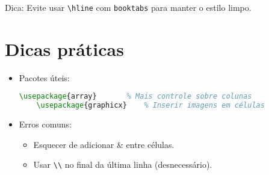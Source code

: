 Dica: Evite usar \verb|\hline| com \verb|booktabs| para manter o estilo limpo.

\section{Dicas práticas}

\begin{itemize}
    \item Pacotes úteis:
    \begin{lstlisting}[language=tex, caption=Pacotes úteis e interessantes para usar com tabelas]
    \usepackage{array}       % Mais controle sobre colunas
    \usepackage{graphicx}    % Inserir imagens em células
    \end{lstlisting}
    \item Erros comuns:
    \begin{itemize}
        \item Esquecer de adicionar \& entre células.
        \item Usar \verb|\\| no final da última linha (desnecessário).
    \end{itemize}
\end{itemize}
    
